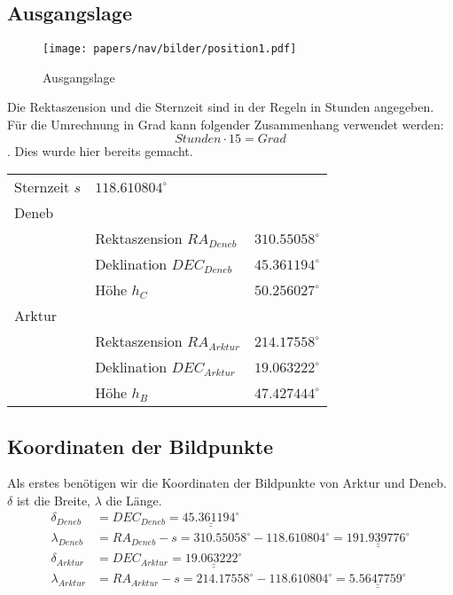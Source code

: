\subsection{Ausgangslage}
\begin{wrapfigure}{R}{5.6cm}
	\texttt{[image: papers/nav/bilder/position1.pdf]}
	\caption{Ausgangslage}
\end{wrapfigure}
Die Rektaszension und die Sternzeit sind in der Regeln in Stunden angegeben.
Für die Umrechnung in Grad kann folgender Zusammenhang verwendet werden:
\[ Stunden \cdot 15 = Grad\].
Dies wurde hier bereits gemacht.
\begin{center}
	\begin{tabular}{l l l}
		Sternzeit $s$ & $118.610804^\circ$ \\
		Deneb&\\
		& Rektaszension $RA_{Deneb}$& $310.55058^\circ$ \\
		& Deklination $DEC_{Deneb}$& $45.361194^\circ$ \\
		& Höhe $h_C$ & $50.256027^\circ$ \\ 
		Arktur &\\
		& Rektaszension $RA_{Arktur}$& $214.17558^\circ$ \\
		& Deklination $DEC_{Arktur}$& $19.063222^\circ$ \\
		& Höhe $h_B$ & $47.427444^\circ$ \\  
	\end{tabular}
\end{center}
\subsection{Koordinaten der Bildpunkte}
Als erstes benötigen wir die Koordinaten der Bildpunkte von Arktur und Deneb. 
$\delta$ ist die Breite, $\lambda$ die Länge.
\begin{align}
\delta_{Deneb}&=DEC_{Deneb} = \underline{\underline{45.361194^\circ}} \nonumber \\ 
\lambda_{Deneb}&=RA_{Deneb} - s = 310.55058^\circ -118.610804^\circ =\underline{\underline{191.939776^\circ}}   \nonumber \\ 
\delta_{Arktur}&=DEC_{Arktur} =  \underline{\underline{19.063222^\circ}} \nonumber \\ 
\lambda_{Arktur}&=RA_{Arktur} - s = 214.17558^\circ -118.610804^\circ = \underline{\underline{5.5647759^\circ}}  \nonumber  
\end{align}


